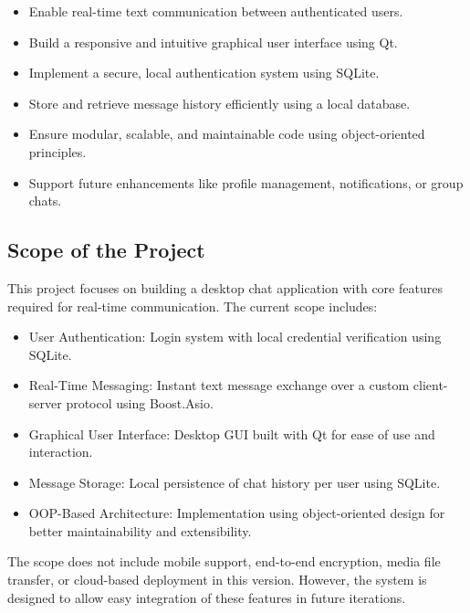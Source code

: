 \documentclass[12pt,a4paper]{article}
\begin{document}
\begin{itemize}

    \item Enable real-time text communication between authenticated users.

    \item Build a responsive and intuitive graphical user interface using Qt.

    \item Implement a secure, local authentication system using SQLite.

    \item Store and retrieve message history efficiently using a local database.

    \item Ensure modular, scalable, and maintainable code using object-oriented principles.

    \item Support future enhancements like profile management, notifications, or group chats.
\end{itemize}
\subsection{Scope of the Project}

This project focuses on building a desktop chat application with core features required for real-time communication. The current scope includes:

\begin{itemize}
    \item User Authentication: Login system with local credential verification using SQLite.

    \item Real-Time Messaging: Instant text message exchange over a custom client-server protocol using Boost.Asio.

    \item Graphical User Interface: Desktop GUI built with Qt for ease of use and interaction.

    \item Message Storage: Local persistence of chat history per user using SQLite.

    \item OOP-Based Architecture: Implementation using object-oriented design for better maintainability and extensibility.

\end{itemize}
The scope does not include mobile support, end-to-end encryption, media file transfer, or cloud-based deployment in this version. However, the system is designed to allow easy integration of these features in future iterations.
\end{document}
